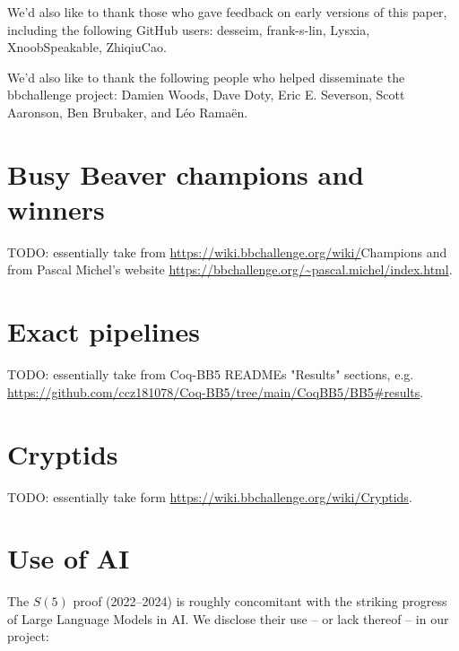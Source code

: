 \documentclass[a4paper,british]{article}
\theoremstyle{definition} %
\numberwithin{equation}{section}
\theoremstyle{definition} %
\newcommand{\ts}[1]{{\color{red}#1}}
\newcommand{\CoqBB}{Coq-BB5\xspace}
\begin{document}
We'd also like to thank those who gave feedback on early versions of this paper, including the following GitHub users: desseim, frank-s-lin, Lysxia, XnoobSpeakable, ZhiqiuCao.

We'd also like to thank the following people who helped disseminate the bbchallenge project: Damien Woods, Dave Doty, Eric E. Severson, Scott Aaronson, Ben Brubaker, and Léo Ramaën.
\newpage
\section{Busy Beaver champions and winners}\label{app:lowerbounds}

\ts{TODO: essentially take from \url{https://wiki.bbchallenge.org/wiki/}Champions and from Pascal Michel's website \url{https://bbchallenge.org/~pascal.michel/index.html}.}

\section{Exact pipelines}\label{app:pipelines}

\ts{TODO: essentially take from \CoqBB READMEs "Results" sections, e.g. \url{https://github.com/ccz181078/Coq-BB5/tree/main/CoqBB5/BB5\#results}.}

\section{Cryptids}\label{app:cryptids}

\ts{TODO: essentially take form \url{https://wiki.bbchallenge.org/wiki/Cryptids}.}

\section{Use of AI}

The $S(5)$ proof (2022--2024) is roughly concomitant with the striking progress of Large Language Models in AI. We disclose their use -- or lack thereof -- in our project:
\end{document}
